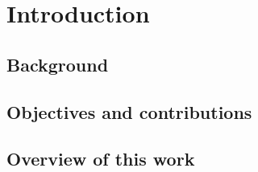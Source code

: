 \chapter{Introduction}
\label{chp:INTRO}


\section{Background}
\label{background}



\section{Objectives and contributions}
\label{objectives}


\section{Overview of this work}
\label{overview_intro}
